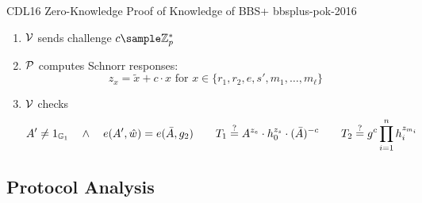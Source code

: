 {\begin{protocol}{CDL16 Zero-Knowledge Proof of Knowledge of BBS+  \cite{camenisch_anonymous_2016}}{bbsplus-pok-2016}
\begin{enumerate}
\begin{itemize}
        \item compute $d \gets (gh_0^s \prod_1^nh_i^{-m_i})^{r_1} \cdot h_0^{-r_2}$

        \item sample Schnorr blinding factors from $\Z_p$
         \[
         \tilde{x} \text{ for } x \in \{r_1, r_2, e, s, m_1, \ldots, m_{\ell}\}
         \]

        \item compute Schnorr Commitments:
        \[
        T_1 \gets A^{\tilde{e}} \cdot h_0^{\tilde{s}} \qquad T_2 \gets g\prod_{i=1}^n h_i^{\tilde{m_i}}
        \]
        
        \item  Send $(A', \Bar{A}, d, T_1, T_2)$ to $\Verifier$
                
        \end{itemize}

    \item $\Verifier$ sends challenge $c \sample \Z_p^*$\

    \item $\mathcal{P}$ computes Schnorr responses:
         \[
         z_x = \tilde{x} + c \cdot x \text{ for } x \in \{r_1, r_2, e, s', m_1, \ldots, m_{\ell}\}
         \]
 
    \item $\Verifier$ checks
        \[
            A' \neq 1_{\mathbb{G}_1} \quad \wedge \quad e(A',\hat{w}) = e(\Bar{A},g_2) \qquad T_1 \stackrel{?}{=} A^{z_e} \cdot h_0^{z_s} \cdot (\Bar{A})^{-c} \qquad T_2 \stackrel{?}{=} g^c\prod_{i=1}^n h_i^{z_{m_i}}
        \]
    \end{enumerate}
\end{protocol}

\newpage
\subsection{Protocol Analysis}


}

